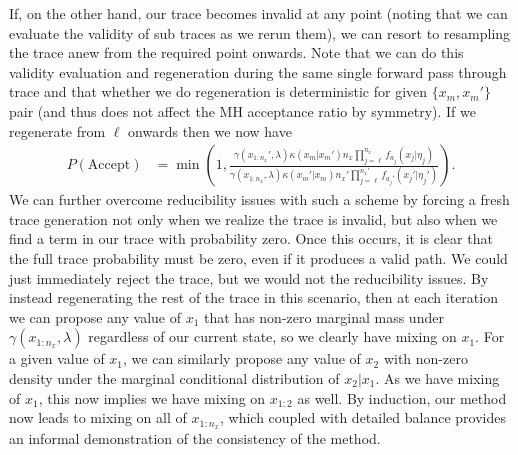 If, on the other hand, our trace becomes invalid
at any point (noting that we can evaluate the validity of sub traces as we rerun them), we can resort to
resampling the trace anew from the required point onwards.  Note that we can do this validity evaluation
and regeneration during the same single forward pass through trace and that whether we do regeneration
is deterministic for given $\{x_m,x_m'\}$ pair (and thus does not affect the MH acceptance ratio by symmetry).
If we regenerate from \sample $\ell$ onwards then we now have
\begin{align}
P(\text{Accept}) &= \min\left(1, \frac{\gamma(x_{1:n_x}',\lambda) \kappa(x_m | x_{m}') n_x \prod_{j=\ell}^{n_x} f_{a_{j}} (x_j | \eta_j)}
{\gamma(x_{1:n_x},\lambda) \kappa(x_m' | x_{m})  n_x' \prod_{j=\ell}^{n_x'} f_{a_{j}'} (x_j' | \eta_j')}\right).
\end{align}
We can further overcome reducibility issues with such a scheme by forcing a fresh trace generation
not only when we realize the trace is invalid, but also when we find a term in our trace with probability zero.
Once this occurs, it is clear that the full trace probability must be zero, even if it produces a valid path.  We
could just immediately reject the trace, but we would not the reducibility issues.  By instead
regenerating the rest of the trace in this scenario, then at each iteration we can propose any value of $x_1$ that has non-zero marginal
mass under $\gamma(x_{1:n_x},\lambda)$ regardless of our current state, so we clearly have mixing on $x_1$.
For a given value of $x_1$, we can similarly propose any value of $x_2$ with non-zero density under the
marginal conditional distribution of $x_2|x_1$.  As we have mixing of $x_1$, this now implies we have
mixing on $x_{1:2}$ as well.  By induction, our method now leads to mixing on all of $x_{1:n_x}$, which
coupled with detailed balance provides an informal demonstration of the consistency of the method.

